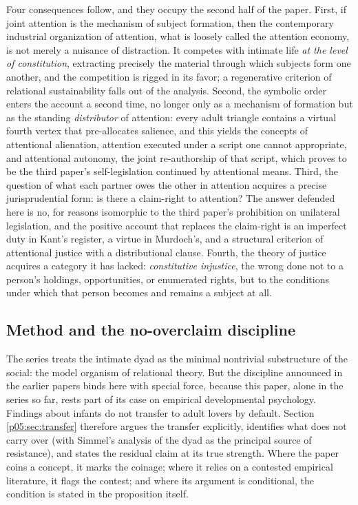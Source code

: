 Four consequences follow, and they occupy the second half of the paper. First, if joint attention is the mechanism of subject formation, then the contemporary industrial organization of attention, what is loosely called the attention economy, is not merely a nuisance of distraction. It competes with intimate life \emph{at the level of constitution}, extracting precisely the material through which subjects form one another, and the competition is rigged in its favor; a regenerative criterion of relational sustainability falls out of the analysis. Second, the symbolic order enters the account a second time, no longer only as a mechanism of formation but as the standing \emph{distributor} of attention: every adult triangle contains a virtual fourth vertex that pre-allocates salience, and this yields the concepts of attentional alienation, attention executed under a script one cannot appropriate, and attentional autonomy, the joint re-authorship of that script, which proves to be the third paper's self-legislation continued by attentional means. Third, the question of what each partner owes the other in attention acquires a precise jurisprudential form: is there a claim-right to attention? The answer defended here is no, for reasons isomorphic to the third paper's prohibition on unilateral legislation, and the positive account that replaces the claim-right is an imperfect duty in Kant's register, a virtue in Murdoch's, and a structural criterion of attentional justice with a distributional clause. Fourth, the theory of justice acquires a category it has lacked: \emph{constitutive injustice}, the wrong done not to a person's holdings, opportunities, or enumerated rights, but to the conditions under which that person becomes and remains a subject at all.

\subsection{Method and the no-overclaim discipline}

The series treats the intimate dyad as the minimal nontrivial substructure of the social: the model organism of relational theory. But the discipline announced in the earlier papers binds here with special force, because this paper, alone in the series so far, rests part of its case on empirical developmental psychology. Findings about infants do not transfer to adult lovers by default. Section \ref{p05:sec:transfer} therefore argues the transfer explicitly, identifies what does not carry over (with Simmel's analysis of the dyad as the principal source of resistance), and states the residual claim at its true strength. Where the paper coins a concept, it marks the coinage; where it relies on a contested empirical literature, it flags the contest; and where its argument is conditional, the condition is stated in the proposition itself.

